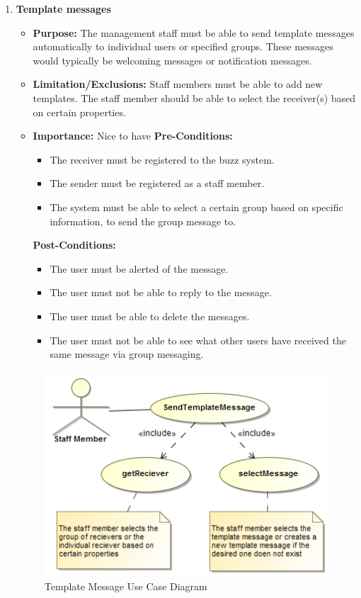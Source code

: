 \documentclass[11pt]{article}
\begin{document}
\begin{enumerate}
\item \textbf{Template messages }
\begin{itemize}
\item \textbf{Purpose: }The management staff must be able to send template messages automatically to individual users or specified groups. These messages would typically be welcoming messages or notification messages. 

	\item  \textbf{Limitation/Exclusions: }
Staff members must be able to add new templates. The staff member should be able to select the receiver(s) based on certain properties.

\item \textbf{Importance:} Nice to have\newline
\textbf{Pre-Conditions: }
	\begin{itemize}
		\item The receiver must be registered to the buzz system.
		\item The sender must be registered as a staff member.
		\item The system must be able to select a certain group based on specific information, to send the group message to.

	\end{itemize}

\textbf{Post-Conditions: }
	\begin{itemize}
		\item The user must be alerted of the message.
		\item The user must not be able to reply to the message.
		\item The user must be able to delete the messages.
		\item The user must not be able to see what other users have received the same message via group messaging.
	\end{itemize}
\end{itemize}

\graphicspath{ {../Diagrams/Maret/usecase/} }	
	\begin{figure}[H]	
    	\includegraphics[scale=0.5]{TemplateMessage.png}
    	\caption{Template Message Use Case Diagram}
	\end{figure}
	

\end{enumerate}
\end{document}
